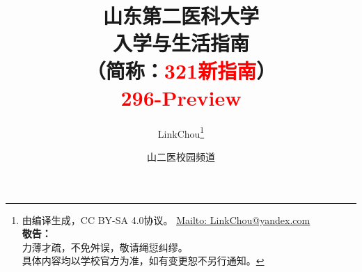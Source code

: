 

\title{%
\normalsize
{\Huge\textbf{山东第二医科大学\\[6pt]入学与生活指南}}\\[6pt]
（简称：\textcolor{red}{321新指南}）\\[25pt]
{\large\textcolor{red}{296-Preview}}\vspace*{-25pt}}
\author{LinkChou\thanks{由\LaTeXe 编译生成，CC BY-SA 4.0协议。%
        \uline{\href{Mailto:LinkChou@yandex.com}{Mailto: LinkChou@yandex.com}}\\%
        \textbf{敬告：}\\%
        \indent\indent 力薄才疏，不免舛误，敬请绳愆纠缪。\\%
        \indent\indent 具体内容均以学校官方为准，如有变更恕不另行通知。}
    \and 山二医校园频道}
\date{\DTMnow}
\maketitle

\renewcommand{\thefootnote}{\arabic{footnote}}

\tableofcontents